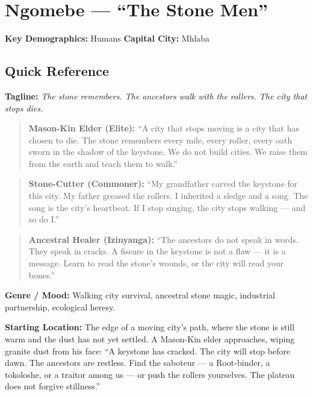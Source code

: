 \section{Ngomebe --- ``The Stone Men''}
\label{chap:ngomebe}

\textbf{Key Demographics: } Humans
\textbf{Capital City: } Mhlaba

\subsection*{Quick Reference}
\textbf{Tagline:} \textit{The stone remembers. The ancestors walk with the rollers. The city that stops dies.}

\begin{quote}
  \textbf{Mason-Kin Elder (Elite):}  
  ``A city that stops moving is a city that has chosen to die. The stone remembers every mile, every roller, every oath sworn in the shadow of the keystone. We do not build cities. We raise them from the earth and teach them to walk.''
\end{quote}

\begin{quote}
  \textbf{Stone-Cutter (Commoner):}  
  ``My grandfather carved the keystone for this city. My father greased the rollers. I inherited a sledge and a song. The song is the city's heartbeat. If I stop singing, the city stops walking --- and so do I.''
\end{quote}

\begin{quote}
  \textbf{Ancestral Healer (Izinyanga):}  
  ``The ancestors do not speak in words. They speak in cracks. A fissure in the keystone is not a flaw --- it is a message. Learn to read the stone's wounds, or the city will read your bones.''
\end{quote}

\textbf{Genre / Mood:} Walking city survival, ancestral stone magic, industrial partnership, ecological heresy.

\textbf{Starting Location:} The edge of a moving city's path, where the stone is still warm and the dust has not yet settled. A Mason-Kin elder approaches, wiping granite dust from his face: ``A keystone has cracked. The city will stop before dawn. The ancestors are restless. Find the saboteur --- a Root-binder, a tokoloshe, or a traitor among us --- or push the rollers yourselves. The plateau does not forgive stillness.''

